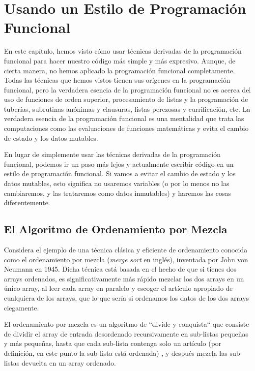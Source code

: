 \section{Usando un Estilo de Programación Funcional}
\label{funcstyle}

En este capítulo, hemos visto cómo usar técnicas derivadas de
la programación funcional para hacer nuestro código más simple
y más expresivo. Aunque, de cierta manera, no hemos aplicado
la programación funcional completamente. Todas las técnicas
que hemos vistos tienen sus orígenes en la programación funcional,
pero la verdadera esencia de la programación funcional no es
acerca del uso de funciones de orden superior, procesamiento de
listas y la programación de tuberías, subrutinas anónimas y clausuras,
listas perezosas y currificación, etc. La verdadera esencia de la
programación funcional es una mentalidad que trata las computaciones
como las evaluaciones de funciones matemáticas y evita el cambio
de estado y los datos mutables.

En lugar de simplemente usar las técnicas derivadas de la
programación funcional, podemos ir un paso más lejos y actualmente
escribir código en un estilo de programación funcional. 
Si vamos a evitar el cambio de estado y los datos mutables, esto
significa no usaremos variables (o por lo menos no las cambiaremos,
y las trataremos como datos inmutables) y haremos las cosas
diferentemente.

\subsection{El Algoritmo de Ordenamiento por Mezcla}
\label{mergesort}

Considera el ejemplo de una técnica clásica y eficiente de ordenamiento
conocida como el ordenamiento por mezcla (\emph{merge sort} en inglés),
inventada por  John von Neumann en 1945. Dicha técnica está basada en el
hecho de que si tienes dos arrays ordenados, es significativamente más
rápido mezclar los dos arrays en un único array, al leer cada array en 
paralelo y escoger el artículo apropiado de cualquiera de los arrays,
que lo que sería si ordenamos los datos de los dos arrays ciegamente.

El ordenamiento por mezcla es un algoritmo de ``divide y conquista``
que consiste de dividir el array de entrada desordenado recursivamente
en sub-listas pequeñas y más pequeñas, hasta que cada sub-lista contenga
solo un artículo (por definición, en este punto la sub-lista está ordenada)
, y después mezcla las sub-listas devuelta en un array ordenado.

